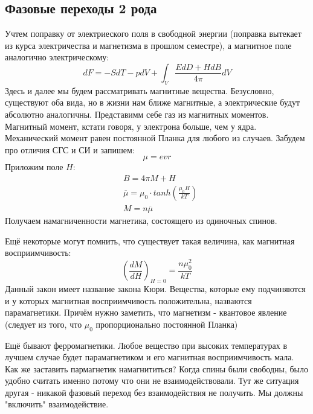 \documentclass[a4paper, 12pt]{article}
\begin{document}
	\subsection{Фазовые переходы 2 рода}
	Учтем поправку от электриеского поля в свободной энергии (поправка вытекает из курса электричества и магнетизма в прошлом семестре), а магнитное поле аналогично электрическому:
	\begin{equation*}
		dF = -SdT - pdV + \int_{V}  \frac{EdD+HdB}{4 \pi} dV
	\end{equation*}
	Здесь и далее мы будем рассматривать магнитные вещества. Безусловно, существуют оба вида, но в жизни нам ближе магнитные, а электрические будут абсолютно аналогичны. Представимм себе газ из магнитных моментов. Магнитный момент, кстати говоря, у электрона больше, чем у ядра. Механический момент равен постоянной Планка для любого из случаев. Забудем про отличия СГС и СИ и запишем:
	\begin{equation*}
		\mu = evr
	\end{equation*}
	Приложим поле $H$:
	\begin{equation*}
		\begin{aligned}
			& B = 4 \pi M + H                                         \\
			& \overline{\mu} = \mu_0 \cdot tanh(\frac{\mu_{0} H}{kT}) \\
			& M = n \overline{\mu}                                    
		\end{aligned}
	\end{equation*}
	Получаем намагниченности магнетика, состоящего из одиночных спинов.
	
	Ещё некоторые могут помнить, что существует такая величина, как магнитная восприимчивость:
	\begin{equation*}
		(\frac{dM}{dH} )_{H=0}= \frac{n \mu_{0}^{2}} {kT}
	\end{equation*}
	Данный закон имеет название закона Кюри. Вещества, которые ему подчиняются и у которых магнитная восприимчивость положительна, назваются парамагнетики. Причём нужно заметить, что магнетизм - квантовое явление (следует из того, что $\mu_{0}$ пропорционально постоянной Планка)
	
	Ещё бывают ферромагнетики. Любое вещество при высоких температурах в лучшем случае будет парамагнетиком и его магнитная восприимчивость мала. Как же заставить пармагнетик намагнититься? Когда спины были свободны, было удобно считать именно потому что они не взаимодействовали. Тут же ситуация другая - никакой фазовый переход без взаимодействия не получить. Мы должны "включить" взаимодействие. 
\end{document}
